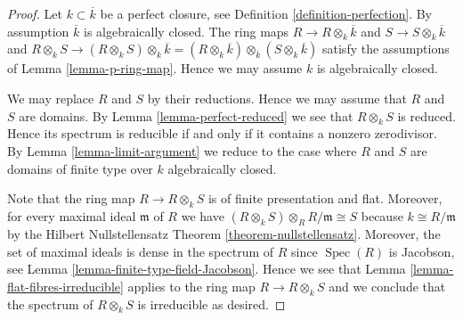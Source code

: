 \documentclass[10pt,a4paper]{amsart}
\theoremstyle{plain}
\theoremstyle{definition}
\theoremstyle{remark}
\numberwithin{equation}{subsection}
\def\Spec{\mathop{\mathrm{Spec}}}
\begin{document}
\begin{proof}
Let $k \subset \overline{k}$ be a perfect closure, see
Definition \ref{definition-perfection}.
By assumption $\overline{k}$ is algebraically closed.
The ring maps $R \to R \otimes_k \overline{k}$ and
$S \to S \otimes_k \overline{k}$ and
$R \otimes_k S \to (R \otimes_k S) \otimes_k \overline{k}
= (R \otimes_k \overline{k}) \otimes_{\overline{k}} (S \otimes_k \overline{k})$
satisfy the assumptions of Lemma \ref{lemma-p-ring-map}.
Hence we may assume $k$ is algebraically closed.

\medskip\noindent
We may replace $R$ and $S$ by their reductions.
Hence we may assume that $R$ and $S$ are domains.
By Lemma \ref{lemma-perfect-reduced} we see that $R \otimes_k S$ is
reduced. Hence its spectrum is reducible if and only if it contains a nonzero
zerodivisor. By Lemma \ref{lemma-limit-argument} we reduce to the case where
$R$ and $S$ are domains of finite type over $k$ algebraically closed.

\medskip\noindent
Note that the ring map $R \to R \otimes_k S$ is of finite
presentation and flat. Moreover, for every maximal ideal
$\mathfrak m$ of $R$ we have
$(R \otimes_k S) \otimes_R R/\mathfrak m \cong S$ because
$k \cong R/\mathfrak m$ by the Hilbert Nullstellensatz Theorem
\ref{theorem-nullstellensatz}. Moreover, the set of
maximal ideals is dense in the spectrum of $R$ since
$\Spec(R)$ is Jacobson, see Lemma \ref{lemma-finite-type-field-Jacobson}.
Hence we see that Lemma \ref{lemma-flat-fibres-irreducible} applies
to the ring map $R \to R \otimes_k S$ and we conclude that
the spectrum of $R \otimes_k S$ is irreducible as desired.
\end{proof}
\end{document}

